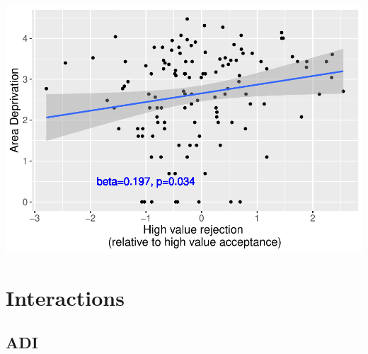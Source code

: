 \documentclass[
]{article}
\begin{document}
\includegraphics{do01_BUDS_files/figure-latex/unnamed-chunk-15-3.pdf}

\hypertarget{interactions}{%
\section{Interactions}\label{interactions}}

\hypertarget{adi-1}{%
\subsection{ADI}\label{adi-1}}
\end{document}
